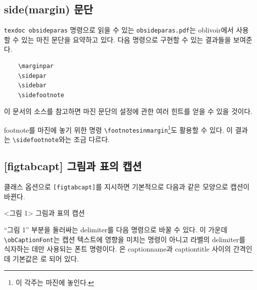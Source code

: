 \documentclass[
	12pt,
	a4paper,
	kosection,
	footnote,
	microtype,
	figtabcapt,
]{oblivoir}
\begin{document}
\subsection{side(margin) 문단}

\verb|texdoc obsideparas| 명령으로 읽을 수 있는 \texttt{obsideparas.pdf}는 \textsf{oblivoir}에서
사용할 수 있는 마진 문단을 요약하고 있다. 다음 명령으로 구현할 수 있는 결과들을 보여준다.

\begin{verbatim}
    \marginpar
    \sidepar
    \sidebar
    \sidefootnote
\end{verbatim}

이 문서의 소스를 참고하면 마진 문단의 설정에 관한 여러 힌트를 얻을 수 있을 것이다.

\footnotesinmargin
footnote를 마진에 놓기 위한 명령 \verb|\footnotesinmargin|\footnote
{이 각주는 마진에 놓인다.}도 활용할 수 있다. 이 결과는 \verb|\sidefootnote|와는
조금 다르다.
\footnotesatfoot

\subsection{[figtabcapt] 그림과 표의 캡션}

클래스 옵션으로 \texttt{[figtabcapt]}를 지시하면 기본적으로 다음과 같은 모양으로 캡션이 바뀐다.

\begin{boxedverbatim}
\caption{그림과 표의 캡션}
\end{boxedverbatim}
\begin{minipage}{\linewidth}
\centering
<그림 1> \quad 그림과 표의 캡션
\end{minipage}

\medskip

``그림 1'' 부분을 둘러싸는 delimiter를 다음 명령으로 바꿀 수 있다. 이 가운데
\verb|\obCaptionFont|는 캡션 텍스트에 영향을 미치는 명령이 아니고 라벨의 delimiter를
식자하는 데만 사용되는 폰트 명령이다. \cmd{\obCaptionAfterdelim}은
captionname과 captiontitle 사이의 간격인데 기본값은 \cmd{\quad}로 되어 있다.
\begin{boxedverbatim}
\renewcommand*\obCaptionnameOpen{[}
\renewcommand*\obCaptionnameClose{]}
\renewcommand*\obCaptionAfterdelim{\hspace{1em}}
\obCaptionFont{\sffamily\bfseries}
\end{boxedverbatim}
\renewcommand*\obCaptionnameOpen{[}
\renewcommand*\obCaptionnameClose{]}
\renewcommand*\obCaptionAfterdelim{\hspace{1em}}
\obCaptionFont{\sffamily}
\end{document}
